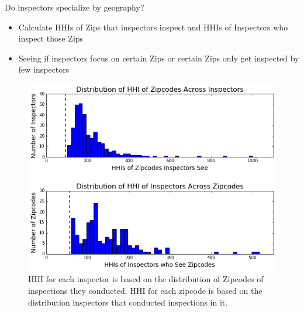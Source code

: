 \documentclass[handout]{beamer}
\begin{document}
\iffalse
\begin{frame}{Do inspectors specialize by geography?}
\begin{itemize}
\item Calculate HHIs of Zips that inspectors inspect and HHIs of Inspectors who inspect those Zips
\item Seeing if inspectors focus on certain Zips or certain Zips only get inspected by few inspectors
\end{itemize}
\end{frame}

\begin{frame}
\begin{figure}
    \centering
    \includegraphics[scale = 0.45]{zip_herf.png}
    \caption{\tiny{HHI for each inspector is based on the distribution of Zipcodes of inspections they conducted. HHI for each zipcode is based on the distribution inspectors that conducted inspections in it.}}
\end{figure}
\end{frame}
\end{document}
